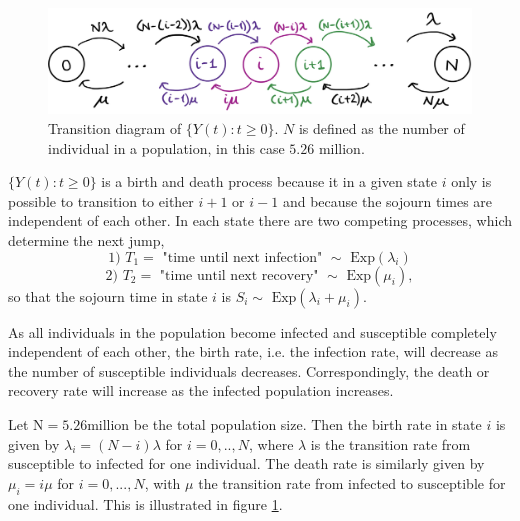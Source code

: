 \begin{figure}
    \centering
    \includegraphics[width=140mm]{1f_new.png}
    \caption{Transition diagram of $\{Y(t):t \geq 0 \}$. $N$ is defined as the number of individual in a population, in this case $5.26 \text{ million.}$}
    \label{transdiagramY}
\end{figure}
$\{Y(t):t \geq 0\}$ is a birth and death process because it in a given state $i$ only is possible to transition to either $i+1$ or $i-1$ and because the sojourn times are independent of each other. In each state there are two competing processes, which determine the next jump,
$$\text{1) } T_1  = \text{ "time until next infection" } \sim \text{ Exp}(\lambda_i)$$
$$\text{2) } T_2 = \text{ "time until next recovery" } \sim \text{ Exp}(\mu_i),$$
so that the sojourn time in state $i$ is $S_i \sim \text{ Exp}(\lambda_i +\mu_i)$.

As all individuals in the population become infected and susceptible completely independent of each other, the birth rate, i.e. the infection rate, will decrease as the number of susceptible individuals decreases. Correspondingly, the death or recovery rate will increase as the infected population increases. 

Let $\text{N}=5.26\text{million}$ be the total population size. Then the birth rate in state $i$ is given by $\lambda_i=(N-i)\lambda$ for $i=0,..,N$, where $\lambda$ is the transition rate from susceptible to infected for one individual. The death rate is similarly given by $\mu_i = i\mu$ for $i=0,...,N$, with $\mu$ the transition rate from infected to susceptible for one individual. This is illustrated in figure \ref{transdiagramY}.

